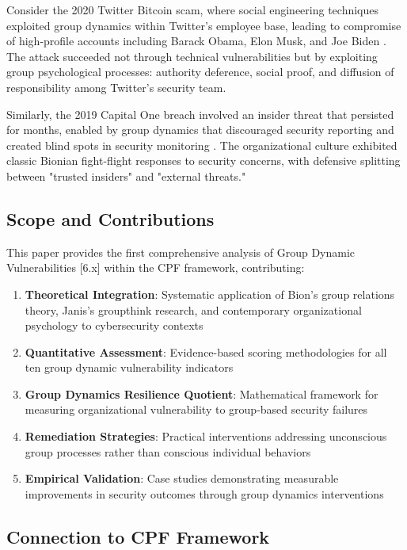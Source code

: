 \documentclass[11pt,a4paper]{article}
\begin{document}
Consider the 2020 Twitter Bitcoin scam, where social engineering techniques exploited group dynamics within Twitter's employee base, leading to compromise of high-profile accounts including Barack Obama, Elon Musk, and Joe Biden \cite{twitter2020}. The attack succeeded not through technical vulnerabilities but by exploiting group psychological processes: authority deference, social proof, and diffusion of responsibility among Twitter's security team.

Similarly, the 2019 Capital One breach involved an insider threat that persisted for months, enabled by group dynamics that discouraged security reporting and created blind spots in security monitoring \cite{capitalone2019}. The organizational culture exhibited classic Bionian fight-flight responses to security concerns, with defensive splitting between "trusted insiders" and "external threats."

\subsection{Scope and Contributions}

This paper provides the first comprehensive analysis of Group Dynamic Vulnerabilities [6.x] within the CPF framework, contributing:

\begin{enumerate}
\item \textbf{Theoretical Integration}: Systematic application of Bion's group relations theory, Janis's groupthink research, and contemporary organizational psychology to cybersecurity contexts
\item \textbf{Quantitative Assessment}: Evidence-based scoring methodologies for all ten group dynamic vulnerability indicators
\item \textbf{Group Dynamics Resilience Quotient}: Mathematical framework for measuring organizational vulnerability to group-based security failures
\item \textbf{Remediation Strategies}: Practical interventions addressing unconscious group processes rather than conscious individual behaviors
\item \textbf{Empirical Validation}: Case studies demonstrating measurable improvements in security outcomes through group dynamics interventions
\end{enumerate}

\subsection{Connection to CPF Framework}
\end{document}

